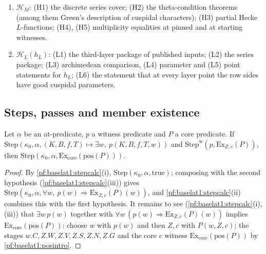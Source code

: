 \begin{definition}
\begin{enumerate}[label=(\alph*)]
  attached to conjugate self-dual regular algebraic cuspidal representations; (E25) the local Bloch--Kato
  statements $\mathrm{BK}_{\mathrm{loc}}(D)$ for all global data $D$.
\item $\mathcal H_M$: (H1) the discrete series cover; (H2) the theta-condition theorems (among them Green's
  description of cuspidal characters); (H3) partial Hecke $L$-functions; (H4), (H5) multiplicity equalities
  at pinned and at starting witnesses.
\item $\mathcal H_L(h_L)$: (L1) the third-layer package of published inputs; (L2) the series package; (L3)
  archimedean comparison, (L4) parameter and (L5) point statements for $h_L$; (L6) the statement that at
  every layer point the row sides have good cuspidal parameters.
\end{enumerate}
%
\end{definition}

\subsection{Steps, passes and member existence}\label{pf:baselat1:ssec:calculus}

\begin{lemma}\label{pf:baselat1:stephascore}
Let $\alpha$ be an at-predicate, $p$ a witness predicate and $P$ a core predicate. If
$\mathrm{Step}(\kappa_0,\alpha,(K,B,f,T)\mapsto\exists w,\ p(K,B,f,T,w))$ and
$\mathrm{Step}^{\mathrm w}(p,\mathrm{Ex}_{Z,c}(P))$, then $\mathrm{Step}(\kappa_0,\alpha,\mathrm{Ex}_{\mathrm{core}}(\mathrm{pos}(P)))$.
\end{lemma}

\begin{proof}
By \cref{pf:baselat1:stepcalc}(i), $\mathrm{Step}(\kappa_0,\alpha,\mathrm{true})$; composing with the
second hypothesis (\cref{pf:baselat1:stepcalc}(iii)) gives $\mathrm{Step}(\kappa_0,\alpha,\forall w,\
p(w)\Rightarrow\mathrm{Ex}_{Z,c}(P)(w))$, and \cref{pf:baselat1:stepcalc}(ii) combines this with the first
hypothesis. It remains to see (\cref{pf:baselat1:stepcalc}(i),(iii)) that $\exists w\,p(w)$ together with
$\forall w\,(p(w)\Rightarrow\mathrm{Ex}_{Z,c}(P)(w))$ implies $\mathrm{Ex}_{\mathrm{core}}(\mathrm{pos}(P))$: choose
$w$ with $p(w)$ and then $Z,c$ with $P(w,Z,c)$; the stages $w.C,Z.W,Z.V,Z.S,Z.N,Z.G$ and the core $c$
witness $\mathrm{Ex}_{\mathrm{core}}(\mathrm{pos}(P))$ by \cref{pf:baselat1:posintro}.
\end{proof}

